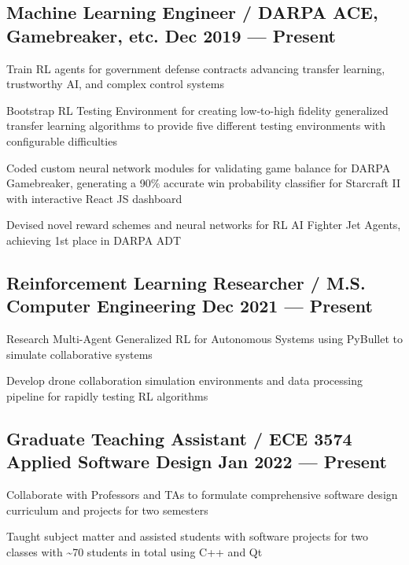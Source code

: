 \subsection{{Machine Learning Engineer / DARPA ACE, Gamebreaker, etc. \hfill Dec 2019 --- Present}}
\begin{zitemize}
	\item Train RL agents for government defense contracts advancing transfer learning, trustworthy AI, and complex
	control systems
	\item Bootstrap RL Testing Environment for creating low-to-high fidelity generalized transfer learning algorithms
	to provide five different testing environments with configurable difficulties
	\item Coded custom neural network modules for validating game balance for DARPA Gamebreaker, generating a 90\%
	accurate win probability classifier for Starcraft II with interactive React JS dashboard
	\item Devised novel reward schemes and neural networks for RL AI Fighter Jet Agents,
	achieving 1st place in DARPA ADT
\end{zitemize}

\subsection{{Reinforcement Learning Researcher / M.S. Computer Engineering  \hfill Dec 2021 --- Present}}
\begin{zitemize}
	\item Research Multi-Agent Generalized RL for Autonomous Systems using PyBullet to simulate
	collaborative systems
	\item Develop drone collaboration simulation environments and data processing pipeline for rapidly testing RL algorithms
\end{zitemize}

\subsection{{Graduate Teaching Assistant / ECE 3574 Applied Software Design  \hfill Jan 2022 --- Present}}
\begin{zitemize}
	\item Collaborate with Professors and TAs to formulate comprehensive software design curriculum and projects for two
	semesters
	\item Taught subject matter and assisted students with software projects for two classes with \textasciitilde 70 students in
	total using C++ and Qt
\end{zitemize}

